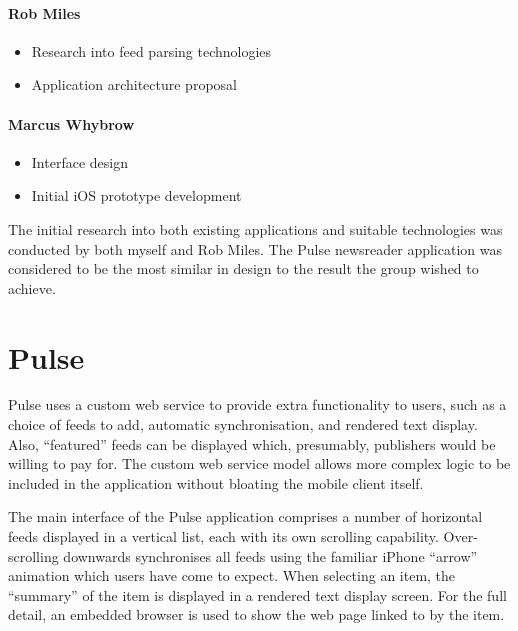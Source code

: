 \documentclass[a4paper,11pt]{article}
\begin{document}
    \paragraph{Rob Miles}

    \begin{itemize}
        \item Research into feed parsing technologies
        \item Application architecture proposal
    \end{itemize}

    \paragraph{Marcus Whybrow}

    \begin{itemize}
        \item Interface design
        \item Initial iOS prototype development
    \end{itemize}

    The initial research into both existing applications and suitable
    technologies was conducted by both myself and Rob Miles. The Pulse
    newsreader application was considered to be the most similar in design to
    the result the group wished to achieve.

    \section{Pulse}

    Pulse uses a custom web service to provide extra functionality to users,
    such as a choice of feeds to add, automatic synchronisation, and rendered
    text display. Also, “featured” feeds can be displayed which, presumably,
    publishers would be willing to pay for. The custom web service model allows
    more complex logic to be included in the application without bloating the
    mobile client itself.

    The main interface of the Pulse application comprises a number of
    horizontal feeds displayed in a vertical list, each with its own scrolling
    capability. Over-scrolling downwards synchronises all feeds using the
    familiar iPhone “arrow” animation which users have come to expect. When
    selecting an item, the “summary” of the item is displayed in a rendered
    text display screen. For the full detail, an embedded browser is used to
    show the web page linked to by the item.
\end{document}
